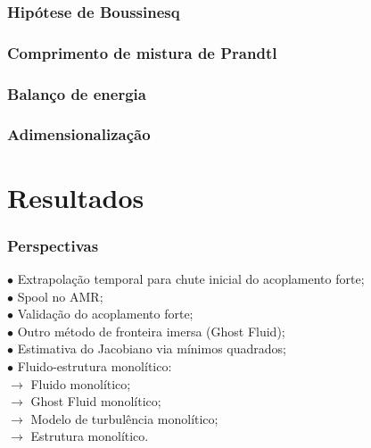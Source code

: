 \documentclass[xcolor=dvipsnames,10pt,aspectratio=169]{beamer}
\begin{document}
		
		
		
		
		\begin{frame}
			\frametitle{Hipótese de Boussinesq}
		\end{frame}
	
	
	
	
		
		\begin{frame}
			\frametitle{Comprimento de mistura de Prandtl}
		\end{frame}
	
	
	
	
	
		\begin{frame}
			\frametitle{Balanço de energia}
		\end{frame}
	
	
	
	
	
		\begin{frame}
			\frametitle{Adimensionalização}
		\end{frame}
	


		
		
	\section{Resultados}
		
		


		\begin{frame}
			\frametitle{Perspectivas}
			$\bullet$ Extrapolação temporal para chute inicial do acoplamento forte;\\
			$\bullet$ Spool no AMR;\\
			$\bullet$ Validação do acoplamento forte;\\
			$\bullet$ Outro método de fronteira imersa (Ghost Fluid);\\
			$\bullet$ Estimativa do Jacobiano via mínimos quadrados;\\
			$\bullet$ Fluido-estrutura monolítico:\\
			$\longrightarrow$ Fluido monolítico;\\
			$\longrightarrow$ Ghost Fluid monolítico;\\
			$\longrightarrow$ Modelo de turbulência monolítico;\\
			$\longrightarrow$ Estrutura monolítico.\\
		\end{frame}	
	
	
	
\end{document}
